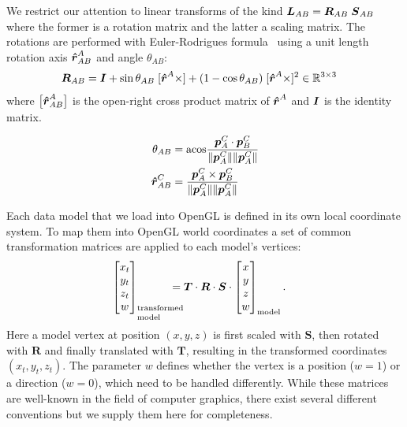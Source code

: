 We restrict our attention to linear transforms of the kind $\boldsymbol{L}_{AB} = \boldsymbol{R}_{AB}\;\boldsymbol{S}_{AB}$ where the former is a rotation matrix and the latter a scaling matrix. The rotations are performed with Euler-Rodrigues formula~\cite{Dai2015} using a unit length rotation axis $\boldsymbol{\hat{r}}_{AB}^A$ and angle $\theta_{AB}$:
%
\begin{align}\label{eq:M}
\mat{R}_{AB} &= \I + \sin\theta_{AB}\;[\dvec{\hat{r}}^A\times] + (1-\cos\theta_{AB})\;[\dvec{\hat{r}}^A\times]^2 \in\mathbb{R}^{3\times3}
\end{align}
%
where $\big[\boldsymbol{\hat{r}}_{AB}^A\big]$ is the open-right cross product matrix of $\boldsymbol{\hat{r}}^A$ and $\boldsymbol{I}$ is the identity matrix. 

\begin{align}
\theta_{AB}
&= \mathrm{acos}\frac{\boldsymbol{p}_{A}^{C}\cdot\boldsymbol{p}_{B}^{C}}{\lVert\boldsymbol{p}_{A}^{C}\rVert\lVert\boldsymbol{p}_{A}^{C}\rVert} \\
\boldsymbol{\hat{r}}_{AB}^C &=  \frac{\boldsymbol{p}_{A}^{C}\times\boldsymbol{p}_{B}^{C}}{\lVert\boldsymbol{p}_{A}^{C}\rVert\lVert\boldsymbol{p}_{A}^{C}\rVert}
\end{align}


Each data model that we load into OpenGL is defined in its own local coordinate system. To map them into OpenGL world coordinates a set of common transformation matrices are applied to each model's vertices:
%
\begin{align}
\bmat{x_t \\ y_t \\ z_t \\ w}_\text{\parbox{1cm}{\setlength\baselineskip{0.3cm}transformed\\model}} &= \boldsymbol{T} \cdot \boldsymbol{R} \cdot \boldsymbol{S} \cdot \bmat{x \\ y \\ z \\ w}_\text{model}.
\end{align}
%
Here a model vertex at position $(x,y,z)$ is first scaled with $\boldsymbol{S}$, then rotated with $\boldsymbol{R}$ and finally translated with $\boldsymbol{T}$, resulting in the transformed coordinates $(x_t,y_t,z_t)$. The parameter $w$ defines whether the vertex is a position ($w=1$) or a direction ($w=0$), which need to be handled differently. While these matrices are well-known in the field of computer graphics, there exist several different conventions but we supply them here for completeness.

